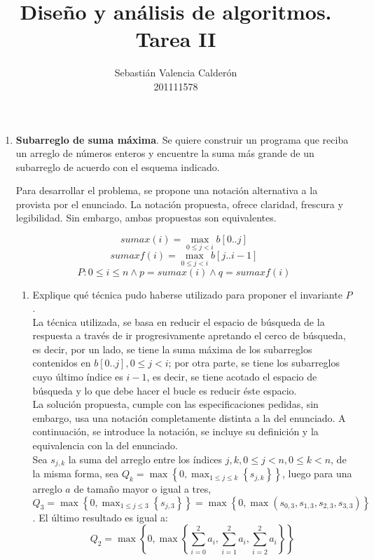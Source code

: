 \documentclass[11pt,spanish]{article}
\title{Diseño y análisis de algoritmos. Tarea II}
\author{Sebastián Valencia Calderón\\
  \small 201111578
}
\begin{document}
\maketitle

\begin{enumerate}
	\item \textbf{Subarreglo de suma máxima}. Se quiere construir un programa 	que reciba un arreglo de números enteros y encuentre la suma más
grande de un subarreglo de acuerdo con el esquema indicado. 

Para desarrollar el problema, se propone una notación alternativa a la provista por el enunciado. La notación propuesta, ofrece claridad, frescura y legibilidad. Sin embargo, ambas propuestas son equivalentes.
	
	$$sumax(i) = \max_{0 \leq j < i}b[0 .. j]$$
	$$sumaxf(i) = \max_{0 \leq j < i}b[j .. i - 1]$$
	$$P: 0 \leq i \leq n \wedge p = sumax(i) \wedge q = sumaxf(i)$$

	\begin{enumerate}
		\item Explique qué técnica pudo haberse utilizado para proponer el invariante $P$. \\	
			
		La técnica utilizada, se basa en reducir el espacio de búsqueda de la respuesta a través de ir progresivamente apretando el cerco de búsqueda, es decir, por un lado, se tiene la suma máxima de los subarreglos contenidos en $b[0 .. j], 0 \leq j < i$; por otra parte, se tiene los subarreglos cuyo último índice es $i - 1$, es decir, se tiene acotado el espacio de búsqueda y lo que debe hacer el bucle es reducir éste espacio. \\
		La solución propuesta, cumple con las especificaciones pedidas, sin embargo, usa una notación completamente distinta a la del enunciado. A continuación, se introduce la notación, se incluye su definición y la equivalencia con la del enunciado. \\
		Sea $s_{j, k}$ la suma del arreglo entre los índices $j, k, 0 \leq j < n, 0 \leq k < n$, de la misma forma, sea $Q_{k} = \max \left\{ 0, \max_{1 \leq j \leq k} \left\{ s_{j, k} \right\} \right\}$, luego para una arreglo $a$ de tamaño mayor o igual a tres, $Q_{3} = \max \left\{ 0, \max_{1 \leq j \leq 3} \left\{ s_{j, 3} \right\} \right\} = \max \left\{ 0, \max ( s_{0, 3}, s_{1, 3}, s_{2, 3}, s_{3, 3} ) \right\}$. El último resultado es igual a:
		$$Q_{2} = \max \left\{ 0, \max \left\{\sum_{i = 0}^{2} a_{i}, \sum_{i = 1}^{2} a_{i}, \sum_{i = 2}^{2} a_{i} \right\} \right\}$$
		

\end{enumerate}
\end{enumerate}
\end{document}
